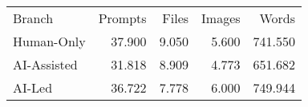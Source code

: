 \begin{tabular}{lrrrr}
\hline\hline
Branch & Prompts & Files & Images & Words \\
Human-Only & 37.900 & 9.050 & 5.600 & 741.550 \\
AI-Assisted & 31.818 & 8.909 & 4.773 & 651.682 \\
AI-Led & 36.722 & 7.778 & 6.000 & 749.944 \\
\hline\hline
\end{tabular}
